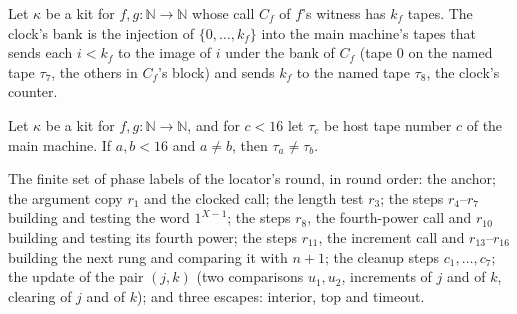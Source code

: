 \begin{definition}
\label{Turing.NTimeDiag.QyKit.bClk}
\leanok
{}
Let $\kappa$ be a kit for $f, g : \mathbb{N} \to \mathbb{N}$ whose call $C_f$ of $f$'s witness has
$k_f$ tapes. The clock's bank is the injection of $\{0, \dots, k_f\}$ into the main machine's
tapes that sends each $i < k_f$ to the image of $i$ under the bank of $C_f$ (tape $0$ on the named
tape $\tau_7$, the others in $C_f$'s block) and sends $k_f$ to the named tape $\tau_8$, the clock's
counter.
\end{definition}

\begin{theorem}
\label{Turing.NTimeDiag.QyKit.tp_ne}
\leanok
{}
Let $\kappa$ be a kit for $f, g : \mathbb{N} \to \mathbb{N}$, and for $c < 16$ let $\tau_c$ be host
tape number $c$ of the main machine. If $a, b < 16$ and $a \ne b$, then $\tau_a \ne \tau_b$.
\end{theorem}

\begin{definition}
\label{Turing.NTimeDiag.QyLK}
\leanok
The finite set of phase labels of the locator's round, in round order: the anchor; the argument
copy $r_1$ and the clocked call; the length test $r_3$; the steps $r_4$--$r_7$ building and
testing the word $1^{X-1}$; the steps $r_8$, the fourth-power call and $r_{10}$ building and
testing its fourth power; the steps $r_{11}$, the increment call and $r_{13}$--$r_{16}$ building
the next rung and comparing it with $n + 1$; the cleanup steps $c_1, \dots, c_7$; the update of the
pair $(j, k)$ (two comparisons $u_1, u_2$, increments of $j$ and of $k$, clearing of $j$ and of
$k$); and three escapes: interior, top and timeout.
\end{definition}

